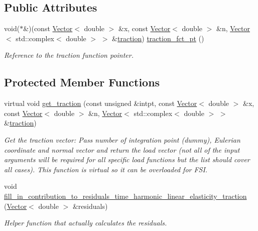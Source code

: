 \subsection*{Public Attributes}
\begin{DoxyCompactItemize}
\item 
void($\ast$\&)(const \hyperlink{classoomph_1_1Vector}{Vector}$<$ double $>$ \&x, const \hyperlink{classoomph_1_1Vector}{Vector}$<$ double $>$ \&n, \hyperlink{classoomph_1_1Vector}{Vector}$<$ std\+::complex$<$ double $>$ $>$ \&\hyperlink{classoomph_1_1TimeHarmonicLinearElasticityTractionElement_a29ba3405562f32247d4da72214637151}{traction}) \hyperlink{classoomph_1_1TimeHarmonicLinearElasticityTractionElement_a34ddf18bd24a3ddada02558e573da0f5}{traction\+\_\+fct\+\_\+pt} ()
\begin{DoxyCompactList}\small\item\em Reference to the traction function pointer. \end{DoxyCompactList}\end{DoxyCompactItemize}
\subsection*{Protected Member Functions}
\begin{DoxyCompactItemize}
\item 
virtual void \hyperlink{classoomph_1_1TimeHarmonicLinearElasticityTractionElement_a7f6a07e3388fa87693fc890c790d7fcc}{get\+\_\+traction} (const unsigned \&intpt, const \hyperlink{classoomph_1_1Vector}{Vector}$<$ double $>$ \&x, const \hyperlink{classoomph_1_1Vector}{Vector}$<$ double $>$ \&n, \hyperlink{classoomph_1_1Vector}{Vector}$<$ std\+::complex$<$ double $>$ $>$ \&\hyperlink{classoomph_1_1TimeHarmonicLinearElasticityTractionElement_a29ba3405562f32247d4da72214637151}{traction})
\begin{DoxyCompactList}\small\item\em Get the traction vector\+: Pass number of integration point (dummy), Eulerian coordinate and normal vector and return the load vector (not all of the input arguments will be required for all specific load functions but the list should cover all cases). This function is virtual so it can be overloaded for F\+SI. \end{DoxyCompactList}\item 
void \hyperlink{classoomph_1_1TimeHarmonicLinearElasticityTractionElement_a00c1d464d763a996bf42f6893a053ae9}{fill\+\_\+in\+\_\+contribution\+\_\+to\+\_\+residuals\+\_\+time\+\_\+harmonic\+\_\+linear\+\_\+elasticity\+\_\+traction} (\hyperlink{classoomph_1_1Vector}{Vector}$<$ double $>$ \&residuals)
\begin{DoxyCompactList}\small\item\em Helper function that actually calculates the residuals. \end{DoxyCompactList}\end{DoxyCompactItemize}
